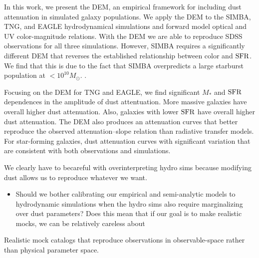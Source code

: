 In this work, we present the DEM, an empirical framework for including dust
attenuation in simulated galaxy populations. We apply the DEM to the SIMBA,
TNG, and EAGLE hydrodynamical simulations and forward model optical and UV
color-magnitude relations. %
With the DEM we are able to reproduce SDSS observations for all three
simulations. However, SIMBA requires a significantly different DEM that
reverses the established relationship between color and ${\rm SFR}$. We find that
this is due to the fact that SIMBA overpredicts a large starburst population at
$<10^{10}M_\odot$. .

Focusing on the DEM for TNG and EAGLE, we find significant $M_*$ and ${\rm SFR}$
dependences in the amplitude of dust attentuation. More massive
galaxies have overall higher dust attenuation. Also, galaxies with lower 
${\rm SFR}$ have overall higher dust attenuation. The DEM also produces an
attenuation curves that better reproduce the observed attenuation–slope
relation than radiative transfer models. For star-forming galaxies, 
dust attenuation curves with significant variation that are consistent with both observations and simulations.

We clearly have to becareful with overinterpreting hydro sims because modifying
dust allows us to reproduce whatever we want. 
\begin{itemize}
    \item Should we bother calibrating our empirical and semi-analytic models
        to hydrodynamic simulations when the hydro sims also require
        marginalizing over dust parameters? Does this mean that if our goal is
        to make realistic mocks, we can be relatively careless about 
\end{itemize}

Realistic mock catalogs that reproduce observations in observable-space rather
than physical parameter space.   
